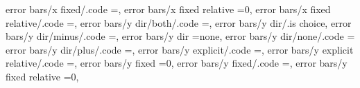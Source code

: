 {{{error bars/x fixed/.code                                           =\def\pgfplots@errorbars@xfixed{#1}\def\pgfplots@errorbars@xmode{0},                                                                
error bars/x fixed relative                                        =0,                                                                                                                                 
error bars/x fixed relative/.code                                  =\def\pgfplots@errorbars@xrel{#1}\def\pgfplots@errorbars@xmode{1},                                                                  
error bars/y dir/both/.code                                        =\def\pgfplots@errorbars@ydirection{3}\pgfplots@errorbars@enabledtrue,                                                              
error bars/y dir/.is choice,
error bars/y dir/minus/.code                                       =\def\pgfplots@errorbars@ydirection{2}\pgfplots@errorbars@enabledtrue,                                                              
error bars/y dir                                                   =none,                                                                                                                              
error bars/y dir/none/.code                                        ={                                                                                                                                 
error bars/y dir/plus/.code                                        =\def\pgfplots@errorbars@ydirection{1}\pgfplots@errorbars@enabledtrue,                                                              
error bars/y explicit/.code                                        =\def\pgfplots@errorbars@ymode{2},                                                                                                  
error bars/y explicit relative/.code                               =\def\pgfplots@errorbars@ymode{3},                                                                                                  
error bars/y fixed                                                 =0,                                                                                                                                 
error bars/y fixed/.code                                           =\def\pgfplots@errorbars@yfixed{#1}\def\pgfplots@errorbars@ymode{0},                                                                
error bars/y fixed relative                                        =0,                                                                                                                                 
}}}}
